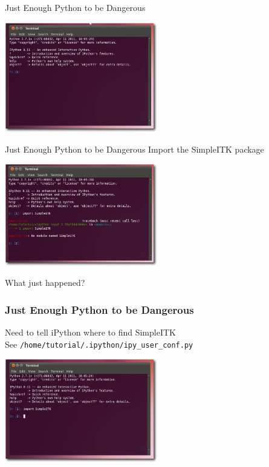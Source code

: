 \begin{frame}{Just Enough Python to be Dangerous}
\begin{center}
  \includegraphics[width=0.5\textwidth]{Images/iPythonWindow_shadow}
\end{center}
\end{frame}

\begin{frame}{Just Enough Python to be Dangerous}
Import the SimpleITK package
\begin{center}
  \includegraphics[width=0.5\textwidth]{Images/iPythonImportError_shadow}
\end{center}
What just happened?
\end{frame}

\begin{frame}[fragile]
\frametitle{Just Enough Python to be Dangerous}
Need to tell iPython where to find SimpleITK\\
See \texttt{/home/tutorial/.ipython/ipy\_user\_conf.py}
\begin{center}
  \includegraphics[width=0.5\textwidth]{Images/iPythonWithSimpleITK_shadow}
\end{center}
\end{frame}

